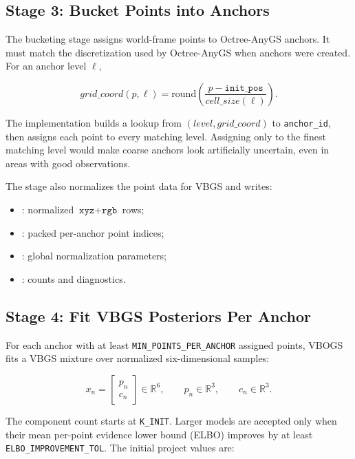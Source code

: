 \documentclass[11pt]{article}
\newcommand{\R}{\mathbb{R}}
\begin{document}
\subsection{Stage 3: Bucket Points into Anchors}

The bucketing stage assigns world-frame points to Octree-AnyGS anchors. It must
match the discretization used by Octree-AnyGS when anchors were created. For an
anchor level \(\ell\),

\[
  grid\_coord(p,\ell)
  =
  \mathrm{round}
  \left(
    \frac{p - \texttt{init\_pos}}{cell\_size(\ell)}
  \right).
\]

The implementation builds a lookup from \((level, grid\_coord)\) to
\texttt{anchor\_id}, then assigns each point to every matching level. Assigning
only to the finest matching level would make coarse anchors look artificially
uncertain, even in areas with good observations.

The stage also normalizes the point data for VBGS and writes:

\begin{itemize}
  \item {}: normalized \(\texttt{xyz}+\texttt{rgb}\) rows;
  \item {}: packed per-anchor point indices;
  \item {}: global normalization parameters;
  \item {}: counts and diagnostics.
\end{itemize}

\subsection{Stage 4: Fit VBGS Posteriors Per Anchor}

For each anchor with at least \texttt{MIN\_POINTS\_PER\_ANCHOR} assigned
points, VBOGS fits a VBGS mixture over normalized six-dimensional samples:

\[
  x_n =
  \begin{bmatrix}
    p_n \\
    c_n
  \end{bmatrix}
  \in \R^6,
  \qquad
  p_n \in \R^3,
  \qquad
  c_n \in \R^3.
\]

The component count starts at \texttt{K\_INIT}. Larger models are accepted only
when their mean per-point evidence lower bound (ELBO) improves by at least
\texttt{ELBO\_IMPROVEMENT\_TOL}. The initial project values are:
\end{document}
